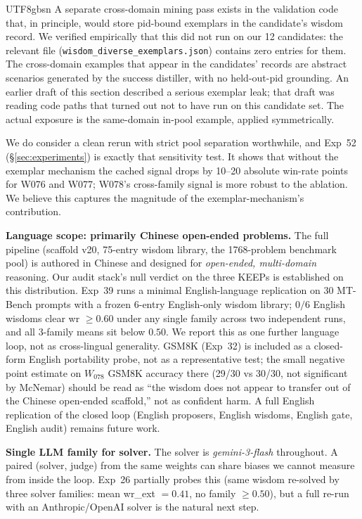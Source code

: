 \documentclass{article}
\begin{document}
\begin{CJK*}{UTF8}{gbsn}
A separate cross-domain mining pass exists in the validation
code that, in principle, would store pid-bound exemplars in the
candidate's wisdom record. We verified empirically that this did
not run on our 12 candidates: the relevant file
(\texttt{wisdom\_diverse\_exemplars.json}) contains zero entries
for them. The cross-domain examples that appear in the
candidates' records are abstract scenarios generated by the
success distiller, with no held-out-pid grounding. An earlier
draft of this section described a serious exemplar leak; that
draft was reading code paths that turned out not to have run on
this candidate set. The actual exposure is the same-domain
in-pool example, applied symmetrically.

We do consider a clean rerun with strict pool separation
worthwhile, and Exp~52 (\S\ref{sec:experiments}) is exactly that
sensitivity test. It shows that without the exemplar mechanism
the cached signal drops by 10--20 absolute win-rate points for
W076 and W077; W078's cross-family signal is more robust to the
ablation. We believe this captures the magnitude of the
exemplar-mechanism's contribution.

\textbf{Language scope: primarily Chinese open-ended problems.}
The full pipeline (scaffold v20, 75-entry wisdom library, the
1768-problem benchmark pool) is authored in Chinese and designed
for \emph{open-ended, multi-domain} reasoning. Our audit stack's
null verdict on the three KEEPs is established on this
distribution. Exp~39 runs a minimal English-language replication
on 30 MT-Bench prompts with a frozen 6-entry English-only wisdom
library; \(0/6\) English wisdoms clear wr \(\geq 0.60\) under any
single family across two independent runs, and all 3-family means
sit below \(0.50\). We report this as one further language loop,
not as cross-lingual generality. GSM8K (Exp~32) is included as a closed-form English
portability probe, not as a representative test; the small
negative point estimate on \(W_{078}\) GSM8K accuracy there
(29/30 vs 30/30, not significant by McNemar) should be read as
``the wisdom does not appear to transfer out of the Chinese
open-ended scaffold,'' not as confident harm. A full English
replication of the closed loop (English
proposers, English wisdoms, English gate, English audit) remains
future work.

\textbf{Single LLM family for solver.} The solver is
\emph{gemini-3-flash} throughout. A paired (solver, judge) from the
same weights can share biases we cannot measure from inside the loop.
Exp~26 partially probes this (same wisdom re-solved by three solver
families: mean wr\_ext \(= 0.41\), no family \(\geq 0.50\)), but a full
re-run with an Anthropic/OpenAI solver is the natural next step.


\end{CJK*}
\end{document}
